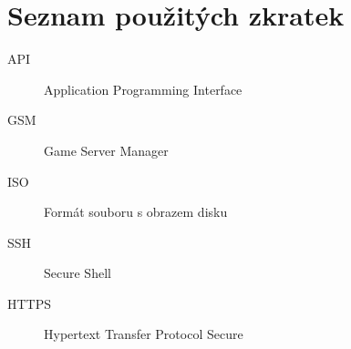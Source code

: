 \chapter{Seznam použitých zkratek}

\begin{description}
	\item[API] Application Programming Interface
	\item[GSM] Game Server Manager 
	\item[ISO] Formát souboru s obrazem disku
	\item[SSH] Secure Shell
	\item[HTTPS] Hypertext Transfer Protocol Secure
\end{description}
